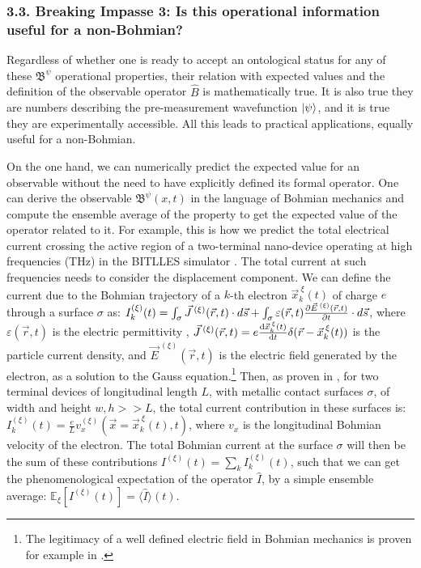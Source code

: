 \documentclass[11pt, a4paper]{article} %
\newcommand{\B}{\mathfrak{B}}
\begin{document}
\subsubsection*{3.3. Breaking Impasse 3: Is this operational information useful for a non-Bohmian?}
\vspace{-0.15cm}

Regardless of whether one is ready to accept an ontological status for any of these $\B^\psi$ operational properties, their relation with expected values and the definition of the observable operator $\hat{B}$ is mathematically true. It is also true they are numbers describing the pre-measurement wavefunction $\ket{\psi}$, and it is true they are experimentally accessible. All this leads to practical applications, equally useful for a non-Bohmian.

On the one hand, we can numerically predict the expected value for an observable without the need to have explicitly defined its formal operator. One can derive the observable $\B^\psi(x,t)$ in the language of Bohmian mechanics and compute the ensemble average of the property to get the expected value of the operator related to it. For example, this is how we predict the total electrical current crossing the active region of a two-terminal nano-device operating at high frequencies (THz) in the BITLLES simulator \cite{equiv, Pel}. The total current at such frequencies needs to consider the displacement component. We can define the current due to the Bohmian trajectory of a $k$-th electron $\vec{x}_k^{\:\xi}(t)$ of charge $e$ through a surface $\sigma$ as: $I_k^{(\xi)}(t)=\int_\sigma \vec{J}^{\:(\xi)}(\vec{r},t)\cdot d\vec{s}+\int_\sigma \varepsilon(\vec{r},t)\pdv{\vec{E}^{\:(\xi)}(\vec{r},t)}{t}\cdot d\vec{s}$, where $\varepsilon(\vec{r},t)$ is the electric permittivity , $\vec{J}^{\:(\xi)}(\vec{r},t)=e\dv{\vec{x}_k^{\:\xi}(t)}{t}\delta(\vec{r}-\vec{x}_k^{\:\xi}(t))$ is the particle current density, and $\vec{E}^{\:(\xi)}(\vec{r},t)$ is the electric field generated by the electron, as a solution to the Gauss equation.\footnote{The legitimacy of a well defined electric field in Bohmian mechanics is proven for example in \cite{lightMatter}.} Then, as proven in \cite{Pel}, for two terminal devices of longitudinal length $L$, with metallic contact surfaces $\sigma$, of width and height $w,h>>L$, the total current contribution in these surfaces is: $I^{(\xi)}_k(t)=\frac{e}{L}v_x^{(\xi)}(\vec{x}=\vec{x}_k^{\:\xi}(t), t) $, where $v_x$ is the longitudinal Bohmian velocity of the electron. The total Bohmian current at the surface $\sigma$ will then be the sum of these contributions $I^{(\xi)}(t)=\sum_k I^{(\xi)}_k(t)$, such that we can get the phenomenological expectation of the operator $\hat{I}$, by a simple ensemble average: $\mathbb{E}_\xi [I^{(\xi)}(t)]=\langle \hat{I}\rangle(t)$. 
\end{document}
